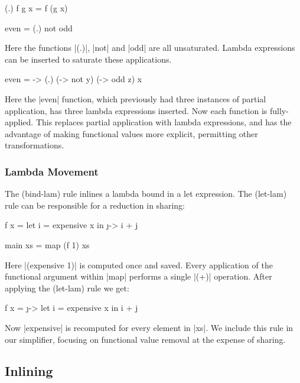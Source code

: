 \documentclass[preprint]{sigplanconf}
\begin{document}
\begin{example}
\ignore\begin{code}
(.) f g x = f (g x)

even = (.) not odd
\end{code}

\noindent Here the functions |(.)|, |not| and |odd| are all unsaturated. Lambda expressions can be inserted to saturate these applications.

\begin{code}
even = \x -> (.) (\y -> not y) (\z -> odd z) x
\end{code}

\noindent Here the |even| function, which previously had three instances of partial application, has three lambda expressions inserted. Now each function is fully-applied. This replaces partial application with lambda expressions, and has the advantage of making functional values more explicit, permitting other transformations.
\end{example}

\subsubsection{Lambda Movement}
\label{sec:sharing}

The (bind-lam) rule inlines a lambda bound in a let expression. The (let-lam) rule can be responsible for a reduction in sharing:

\begin{example}
\begin{code}
f x =  let  i = expensive x
       in   \j -> i + j

main xs = map (f 1) xs
\end{code}

Here |(expensive 1)| is computed once and saved. Every application of the functional argument within |map| performs a single |(+)| operation. After applying the (let-lam) rule we get:

\begin{code}
f x =  \j ->  let  i = expensive x
              in   i + j
\end{code}

Now |expensive| is recomputed for every element in |xs|. We include this rule in our simplifier, focusing on functional value removal at the expense of sharing.
\end{example}

\subsection{Inlining}
\label{sec:inlining}
\end{document}
